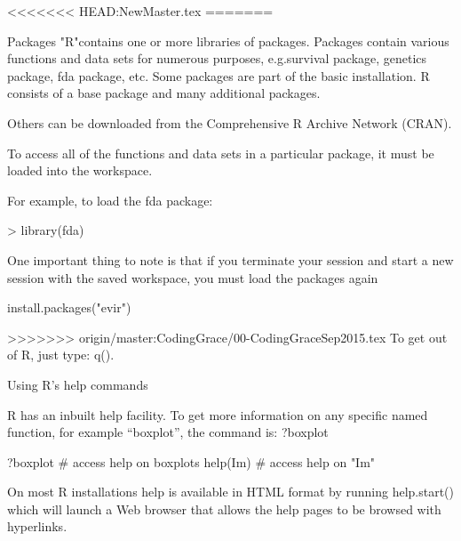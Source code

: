 \begin{frame}
\begin{frame}
<<<<<<< HEAD:NewMaster.tex
=======


Packages
"R"contains one or more libraries of packages. Packages contain various functions and data sets for numerous purposes, e.g.survival package, genetics package, fda package, etc. Some packages are part of the basic installation. 
R consists of a base package and many additional packages.

Others can be downloaded from the Comprehensive R Archive Network (CRAN).

To access all of the functions and data sets in a particular package, it must be loaded into the workspace. 
\end{frame}
\begin{frame}

For example, to load the fda package:

> library(fda)

One important thing to note is that if you terminate your session and start a new session with the saved workspace, you must load  the packages again



install.packages("evir")
 
>>>>>>> origin/master:CodingGrace/00-CodingGraceSep2015.tex
To get out of R, just type: q(). 

\end{frame}
\begin{frame}

Using R's help commands

R has an inbuilt help facility. To get more information on any specific named function, for example “boxplot”, the command is: ?boxplot


?boxplot		# access help on boxplots
help(Im)        # access help on "Im"

\end{frame}
\begin{frame}

On most R installations help is available in HTML format by running help.start() which will launch a Web browser that allows the help pages to be browsed with hyperlinks. 
 




\end{frame}
\end{frame}
